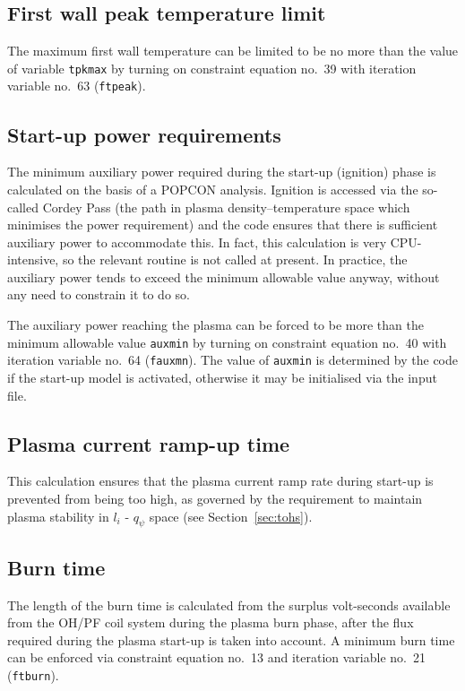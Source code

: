 \documentclass[11pt,a4paper]{report}
\begin{document}
\subsection{First wall peak temperature limit}

The maximum first wall temperature can be limited to be no more than the value
of variable \texttt{tpkmax} by turning on constraint equation no.\ 39 with
iteration variable no.\ 63 (\texttt{ftpeak}).

\subsection{Start-up power requirements}

The minimum auxiliary power required during the start-up (ignition) phase is
calculated on the basis of a POPCON analysis. Ignition is accessed via the
so-called Cordey Pass (the path in plasma density--temperature space which
minimises the power requirement) and the code ensures that there is sufficient
auxiliary power to accommodate this. In fact, this calculation is very
CPU-intensive, so the relevant routine is not called at present. In practice,
the auxiliary power tends to exceed the minimum allowable value anyway,
without any need to constrain it to do so.

The auxiliary power reaching the plasma can be forced to be more than the
minimum allowable value \texttt{auxmin} by turning on constraint equation no.\
40 with iteration variable no.\ 64 (\texttt{fauxmn}). The value of
\texttt{auxmin} is determined by the code if the start-up model is activated,
otherwise it may be initialised via the input file.

\subsection{Plasma current ramp-up time}

This calculation ensures that the plasma current ramp rate during start-up is
prevented from being too high, as governed by the requirement to maintain
plasma stability in $l_i$ - $q_\psi$ space (see Section~\ref{sec:tohs}).

\subsection{Burn time}
The length of the burn time is calculated from the surplus volt-seconds
available from the OH/PF coil system during the plasma burn phase, after the
flux required during the plasma start-up is taken into account. A minimum burn
time can be enforced via constraint equation no.\ 13 and iteration variable
no.\ 21 (\texttt{ftburn}).
\end{document}
